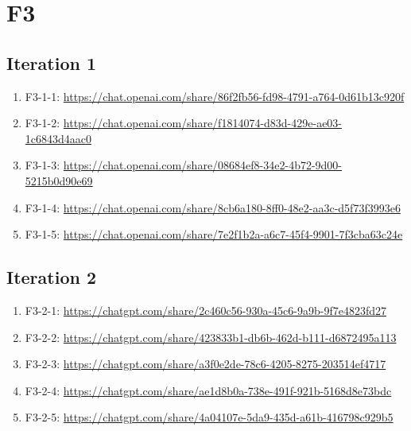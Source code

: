 \section{F3\label{F3-1}}

\subsection{Iteration 1}

\begin{enumerate}
    \item F3-1-1: \href{https://chat.openai.com/share/86f2fb56-fd98-4791-a764-0d61b13c920f}{https://chat.openai.com/share/86f2fb56-fd98-4791-a764-0d61b13c920f}
    \item F3-1-2: \href{https://chat.openai.com/share/f1814074-d83d-429e-ae03-1c6843d4aac0}{https://chat.openai.com/share/f1814074-d83d-429e-ae03-1c6843d4aac0}
    \item F3-1-3: \href{https://chat.openai.com/share/08684ef8-34e2-4b72-9d00-5215b0d90e69}{https://chat.openai.com/share/08684ef8-34e2-4b72-9d00-5215b0d90e69}
    \item F3-1-4: \href{https://chat.openai.com/share/8cb6a180-8ff0-48e2-aa3c-d5f73f3993e6}{https://chat.openai.com/share/8cb6a180-8ff0-48e2-aa3c-d5f73f3993e6}
    \item F3-1-5: \href{https://chat.openai.com/share/7e2f1b2a-a6c7-45f4-9901-7f3cba63c24e}{https://chat.openai.com/share/7e2f1b2a-a6c7-45f4-9901-7f3cba63c24e}
\end{enumerate}

\subsection{Iteration 2}

\begin{enumerate}
    \item F3-2-1: \href{https://chatgpt.com/share/2c460c56-930a-45c6-9a9b-9f7e4823fd27}{https://chatgpt.com/share/2c460c56-930a-45c6-9a9b-9f7e4823fd27}
    \item F3-2-2: \href{https://chatgpt.com/share/423833b1-db6b-462d-b111-d6872495a113}{https://chatgpt.com/share/423833b1-db6b-462d-b111-d6872495a113}
    \item F3-2-3: \href{https://chatgpt.com/share/a3f0e2de-78c6-4205-8275-203514ef4717}{https://chatgpt.com/share/a3f0e2de-78c6-4205-8275-203514ef4717}
    \item F3-2-4: \href{https://chatgpt.com/share/ae1d8b0a-738e-491f-921b-5168d8e73bdc}{https://chatgpt.com/share/ae1d8b0a-738e-491f-921b-5168d8e73bdc}
    \item F3-2-5: \href{https://chatgpt.com/share/4a04107e-5da9-435d-a61b-416798c929b5}{https://chatgpt.com/share/4a04107e-5da9-435d-a61b-416798c929b5}
\end{enumerate}

